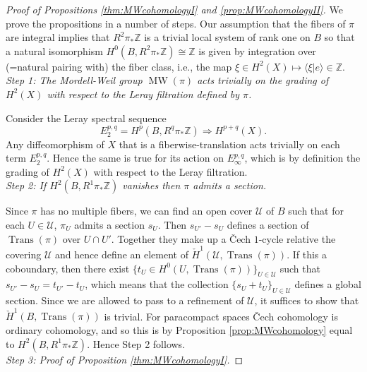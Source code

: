 \documentclass[10pt,a4paper]{amsart}
\def\Uscr{{\mathscr U}}
\def\ZZ{{\mathbb Z}}
\def\la{\langle}
\def\ra{\rangle}
\newcommand\MW{\operatorname{MW}}
\newcommand\Trans{\operatorname{Trans}}
\begin{document}
\begin{proof}[Proof of  Propositions  \ref{thm:MWcohomologyI} and \ref{prop:MWcohomologyII}]
We prove the propositions  in a number of steps.
Our assumption that the fibers of $\pi$ are integral implies that 
$R^2\pi_*\ZZ$ is  a trivial local system of rank one on $B$ so that a natural isomorphism  $H^0(B, R^2\pi_*\ZZ)\cong \ZZ 
$ is given by integration over (=natural pairing with) the fiber class, i.e., the map $\xi\in H^2(X)\mapsto \la \xi|e\ra \in \ZZ$.
\\

\emph{Step 1: The Mordell-Weil group $\MW(\pi)$ acts trivially on the grading of $H^2(X)$ with respect to  the Leray filtration defined by $\pi$. }

Consider the Leray spectral sequence
\[
E_2^{p,q}= H^p(B, R^q\pi_*\ZZ)\Rightarrow H^{p+q}(X).
\]  
Any diffeomorphism of $X$ that is a fiberwise-translation acts trivially on each term $E_2^{p,q}$. Hence the same is true for  its action  on $E_\infty^{p,q}$, which is by definition the grading of $H^2(X)$ with respect to  the Leray filtration.  
\\

\emph{Step 2: If $H^{2}(B,R^1\pi_*\ZZ)$ vanishes then $\pi$ admits a section.}

Since $\pi$ has no multiple fibers, we can find  an open cover $\Uscr$ of  $B$ such that  for each $U\in \Uscr$, $\pi_{U}$ admits a section $s_U$. Then $s_{U'}-s_U$ defines a section of $\Trans(\pi)$ over $U\cap U'$. Together they make up a \v{C}ech $1$-cycle relative the covering $\Uscr$ and hence define an element of $\check{H}^1(\Uscr,\Trans(\pi))$. If this a coboundary, then
there exist $\{t_U\in H^0(U, \Trans(\pi))\}_{U\in \Uscr}$ such that $s_{U'}-s_U=t_{U'}-t_U$, which means that the collection $\{s_U+t_U\}_{U\in\Uscr}$ defines a global section. Since we are allowed to pass to a refinement of $\Uscr$, it suffices to show that $\check{H}^1(B,\Trans(\pi))$ is trivial. For paracompact spaces \v{C}ech cohomology is ordinary cohomology, and so this  is  by Proposition \ref{prop:MWcohomology} equal to $H^{2}(B,R^1\pi_*\ZZ)$. 
Hence Step 2 follows.
\\

\emph{Step 3: Proof  of  Proposition \ref{thm:MWcohomologyI}.}


\end{proof}
\end{document}

